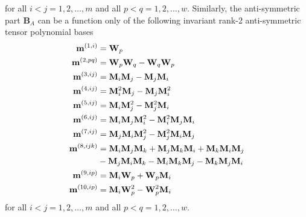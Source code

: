 %
%      	
for all $i<j = 1,2,\ldots,m$  and all $p<q = 1,2,\ldots,w$.  Similarly, the anti-symmetric part  $\mathbf{B}_A$ can be a function only of the following invariant rank-2 anti-symmetric tensor polynomial bases
%
\begin{subequations}
\label{E:29}
\begin{align}
	\mathbf{m}^{(1,i)}  &= \mathbf{W}_p \\ 
	\mathbf{m}^{(2,pq)} &= \mathbf{W}_p \mathbf{W}_q - \mathbf{W}_q \mathbf{W}_p \\ 
	\mathbf{m}^{(3,ij)} &= \mathbf{M}_i \mathbf{M}_j - \mathbf{M}_j \mathbf{M}_i \\ 
	\mathbf{m}^{(4,ij)} &= \mathbf{M}^2_i \mathbf{M}_j - \mathbf{M}_j \mathbf{M}^2_i \\
	\mathbf{m}^{(5,ij)} &= \mathbf{M}_i \mathbf{M}^2_j - \mathbf{M}^2_j \mathbf{M}_i \\
	\mathbf{m}^{(6,ij)} &= \mathbf{M}_i \mathbf{M}_j \mathbf{M}^2_i  
						-  \mathbf{M}^2_i \mathbf{M}_j \mathbf{M}_i \\ 
	\mathbf{m}^{(7,ij)} &= \mathbf{M}_j \mathbf{M}_i \mathbf{M}^2_j  
						-  \mathbf{M}^2_j \mathbf{M}_i \mathbf{M}_j \\  
	\mathbf{m}^{(8,ijk)}&= \mathbf{M}_i \mathbf{M}_j \mathbf{M}_k 
						 + \mathbf{M}_j \mathbf{M}_k \mathbf{M}_i  
						 + \mathbf{M}_k \mathbf{M}_i \mathbf{M}_j \notag \\
						 &- \mathbf{M}_j \mathbf{M}_i \mathbf{M}_k 
						 - \mathbf{M}_i \mathbf{M}_k \mathbf{M}_j 
						 - \mathbf{M}_k \mathbf{M}_j \mathbf{M}_i \\
	\mathbf{m}^{(9,ip)} &= \mathbf{M}_i \mathbf{W}_p + \mathbf{W}_p \mathbf{M}_i   \\
	\mathbf{m}^{(10,ip)} &= \mathbf{M}_i \mathbf{W}^2_p-\mathbf{W}^2_p \mathbf{M}_i 
\end{align}
\end{subequations}	
%
%      
for all $i<j = 1,2,\ldots,m$   and all $p<q = 1,2,\ldots,w$.

